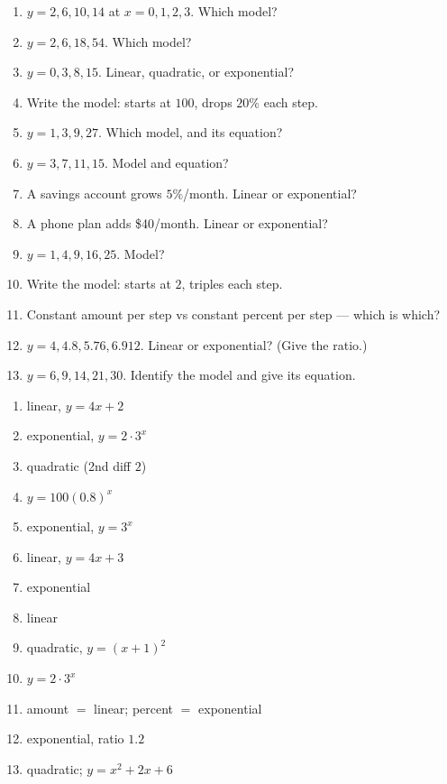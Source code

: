 \documentclass[11pt]{article}
\begin{document}
\begin{recapbox}
\begin{multicols}{2}
\small
\begin{enumerate}[leftmargin=*,itemsep=3pt]
  \item $y=2,6,10,14$ at $x=0,1,2,3$. Which model?
  \item $y=2,6,18,54$. Which model?
  \item $y=0,3,8,15$. Linear, quadratic, or exponential?
  \item Write the model: starts at $100$, drops $20\%$ each step.
  \item $y=1,3,9,27$. Which model, and its equation?
  \item $y=3,7,11,15$. Model and equation?
  \item A savings account grows $5\%$/month. Linear or exponential?
  \item A phone plan adds \$40/month. Linear or exponential?
  \item $y=1,4,9,16,25$. Model?
  \item Write the model: starts at $2$, triples each step.
  \item Constant amount per step vs constant percent per step — which is which?
  \item $y=4,4.8,5.76,6.912$. Linear or exponential? (Give the ratio.)
  \item $y=6,9,14,21,30$. Identify the model and give its equation.
\end{enumerate}
\end{multicols}
\end{recapbox}

\begin{keybox}
\begin{multicols}{2}
\small
\begin{enumerate}[leftmargin=*,itemsep=3pt]
  \item linear, $y=4x+2$
  \item exponential, $y=2\cdot3^{x}$
  \item quadratic (2nd diff $2$)
  \item $y=100(0.8)^{x}$
  \item exponential, $y=3^{x}$
  \item linear, $y=4x+3$
  \item exponential
  \item linear
  \item quadratic, $y=(x+1)^2$
  \item $y=2\cdot3^{x}$
  \item amount $=$ linear; percent $=$ exponential
  \item exponential, ratio $1.2$
  \item quadratic; $y=x^2+2x+6$
\end{enumerate}
\end{multicols}
\end{keybox}
\end{document}
